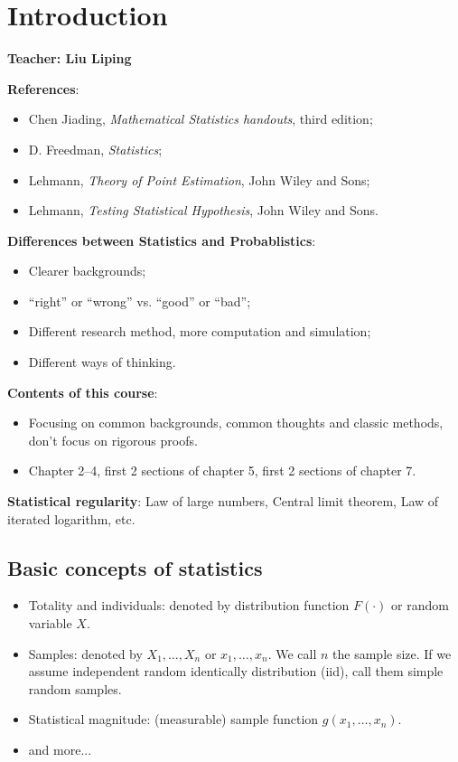 \section{Introduction}
\label{sec:Introduction}
\begin{center}
	\bfseries
	Teacher: Liu Liping
\end{center}

{\bfseries References}:
\begin{itemize}
	\item Chen Jiading, \textit{Mathematical Statistics handouts}, third edition;
	\item D. Freedman, \textit{Statistics};
	\item Lehmann, \textit{Theory of Point Estimation}, John Wiley and Sons;
	\item Lehmann, \textit{Testing Statistical Hypothesis}, John Wiley and Sons.
\end{itemize}

{\bfseries Differences between Statistics and Probablistics}:
\begin{itemize}
	\item Clearer backgrounds;
	\item ``right'' or ``wrong'' vs. ``good'' or ``bad'';
	\item Different research method, more computation and simulation;
	\item Different ways of thinking.
\end{itemize}

{\bfseries Contents of this course}:
\begin{itemize}
	\item Focusing on common backgrounds, common thoughts and classic methods,
		don't focus on rigorous proofs.
	\item Chapter 2--4, first 2 sections of chapter 5, first 2 sections
		of chapter 7.
\end{itemize}

{\bfseries Statistical regularity}:
Law of large numbers, Central limit theorem, Law of iterated logarithm, etc.

\subsection{Basic concepts of statistics}
\label{sub:Basic concepts of statistics}
\begin{itemize}
	\item Totality and individuals: denoted by distribution function
		$F(\cdot)$ or random variable $X$.
	\item Samples: denoted by  $X_1,\dots, X_n$ or $x_1,\dots, x_n$.
		We call $n$ the sample size.
		If we assume independent random identically distribution (iid),
		call them simple random samples.
	\item Statistical magnitude: (measurable) sample function $g(x_1,\dots,x_n)$.
	\item and more...
\end{itemize}

